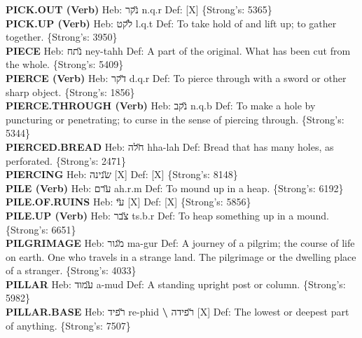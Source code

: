 {\textbf{PICK.OUT (Verb)} Heb: {\large\H נקר} n.q.r Def: {[}X{]} \{Strong's: 5365\}\hfill{}\\

\textbf{PICK.UP (Verb)} Heb: {\large\H לקט} l.q.t Def: To take hold of and lift up; to gather together. \{Strong's: 3950\}\hfill{}\\

\textbf{PIECE} Heb: {\large\H נתח} ney-tahh Def: A part of the original. What has been cut from the whole. \{Strong's: 5409\}\hfill{}\\

\textbf{PIERCE (Verb)} Heb: {\large\H דקר} d.q.r Def: To pierce through with a sword or other sharp object. \{Strong's: 1856\}\hfill{}\\

\textbf{PIERCE.THROUGH (Verb)} Heb: {\large\H נקב} n.q.b Def: To make a hole by puncturing or penetrating; to curse in the sense of piercing through. \{Strong's: 5344\}\hfill{}\\

\textbf{PIERCED.BREAD} Heb: {\large\H חלה} hha-lah Def: Bread that has many holes, as perforated. \{Strong's: 2471\}\hfill{}\\

\textbf{PIERCING} Heb: {\large\H שנינה} {[}X{]} Def: {[}X{]} \{Strong's: 8148\}\hfill{}\\

\textbf{PILE (Verb)} Heb: {\large\H ערם} ah.r.m Def: To mound up in a heap. \{Strong's: 6192\}\hfill{}\\

\textbf{PILE.OF.RUINS} Heb: {\large\H עי} {[}X{]} Def: {[}X{]} \{Strong's: 5856\}\hfill{}\\

\textbf{PILE.UP (Verb)} Heb: {\large\H צבר} ts.b.r Def: To heap something up in a mound. \{Strong's: 6651\}\hfill{}\\

\textbf{PILGRIMAGE} Heb: {\large\H מגור} ma-gur Def: A journey of a pilgrim; the course of life on earth. One who travels in a strange land. The pilgrimage or the dwelling place of a stranger. \{Strong's: 4033\}\hfill{}\\

\textbf{PILLAR} Heb: {\large\H עמוד} a-mud Def: A standing upright post or column. \{Strong's: 5982\}\hfill{}\\

\textbf{PILLAR.BASE} Heb: {\large\H רפיד} re-phid \textbf{\textbackslash{}} {\large\H רפידה} {[}X{]} Def: The lowest or deepest part of anything. \{Strong's: 7507\}\hfill{}\\

}
